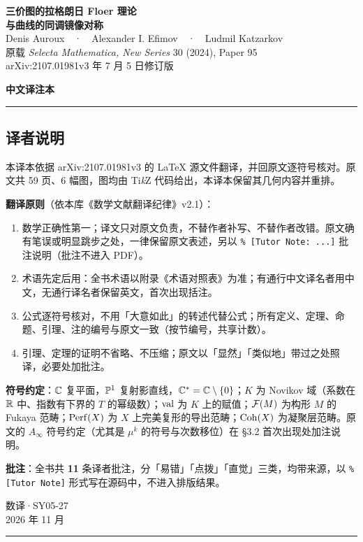 \thispagestyle{plain}
\begin{center}
{\LARGE\bfseries 三价图的拉格朗日 Floer 理论\\[0.3em]与曲线的同调镜像对称}\\[1.2em]
{\large Denis Auroux\ \ ·\ \ Alexander I. Efimov\ \ ·\ \ Ludmil Katzarkov}\\[0.8em]
{\normalsize 原载 \emph{Selecta Mathematica, New Series} 30 (2024), Paper 95}\\[0.2em]
{\normalsize arXiv:2107.01981v3  年 7 月 5 日修订版}
\end{center}

\vspace{1.2em}
\begin{center}
{\large\bfseries 中文译注本}
\end{center}

\vspace{0.6em}
\noindent\rule{\textwidth}{0.4pt}
\subsection*{译者说明}

本译本依据 arXiv:2107.01981v3 的 \LaTeX{} 源文件翻译，并回原文逐符号核对。原文共 59 页、6 幅图，图均由 Ti\emph{k}Z 代码给出，本译本保留其几何内容并重排。

\textbf{翻译原则}（依本库《数学文献翻译纪律》v2.1）：
\begin{enumerate}
\item 数学正确性第一；译文只对原文负责，不替作者补写、不替作者改错。原文确有笔误或明显跳步之处，一律保留原文表述，另以 \texttt{\% [Tutor Note: ...]} 批注说明（批注不进入 PDF）。
\item 术语先定后用：全书术语以附录《术语对照表》为准；有通行中文译名者用中文，无通行译名者保留英文，首次出现括注。
\item 公式逐符号核对，不用「大意如此」的转述代替公式；所有定义、定理、命题、引理、注的编号与原文一致（按节编号，共享计数）。
\item 引理、定理的证明不省略、不压缩；原文以「显然」「类似地」带过之处照译，必要处加批注。
\end{enumerate}

\textbf{符号约定}：$\mathbb{C}$ 复平面，$\mathbb{P}^1$ 复射影直线，$\mathbb{C}^*=\mathbb{C}\setminus\{0\}$；$K$ 为 Novikov 域（系数在 $\mathbb{R}$ 中、指数有下界的 $T$ 的幂级数）；$\operatorname{val}$ 为 $K$ 上的赋值；$\mathcal{F}(M)$ 为构形 $M$ 的 Fukaya 范畴；$\operatorname{Perf}(X)$ 为 $X$ 上完美复形的导出范畴；$\operatorname{Coh}(X)$ 为凝聚层范畴。原文的 $A_\infty$ 符号约定（尤其是 $\mu^k$ 的符号与次数移位）在 §3.2 首次出现处加注说明。

\textbf{批注}：全书共 \textbf{11} 条译者批注，分「易错」「点拨」「直觉」三类，均带来源，以 \texttt{\% [Tutor Note]} 形式写在源码中，不进入排版结果。

\begin{flushright}
数译·SY05-27\\2026 年 11 月
\end{flushright}

\noindent\rule{\textwidth}{0.4pt}

\vspace{0.8em}
\newpage
\tableofcontents
\newpage
